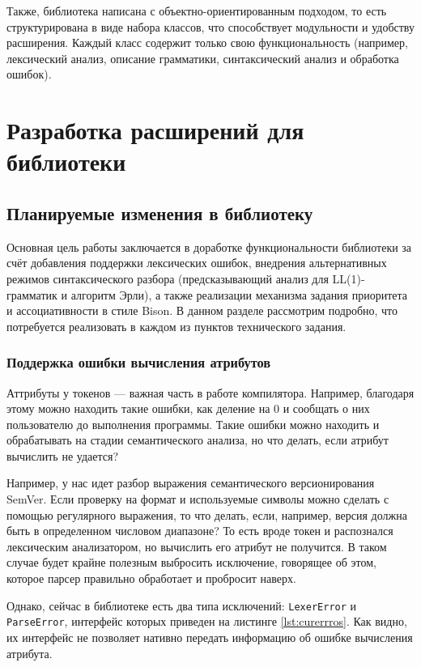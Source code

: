 \documentclass[14pt, russian]{scrartcl}
\begin{document}
Также, библиотека написана с объектно-ориентированным подходом, то есть структурирована в виде набора классов,
что способствует модульности и удобству расширения. Каждый класс содержит только свою функциональность
(например, лексический анализ, описание грамматики, синтаксический анализ и обработка ошибок).

\section{Разработка расширений для библиотеки}

\subsection{Планируемые изменения в библиотеку}

Основная цель работы заключается в доработке функциональности библиотеки за счёт добавления поддержки лексических
ошибок, внедрения альтернативных режимов синтаксического разбора (предсказывающий анализ для LL(1)-грамматик
и алгоритм Эрли), а также реализации механизма задания приоритета и ассоциативности в стиле Bison. В данном разделе
рассмотрим подробно, что потребуется реализовать в каждом из пунктов технического задания.

\subsubsection{Поддержка ошибки вычисления атрибутов}

Аттрибуты у токенов --- важная часть в работе компилятора. Например, благодаря этому можно находить такие ошибки, как
деление на 0 и сообщать о них пользователю до выполнения программы. Такие ошибки можно находить и обрабатывать
на стадии семантического анализа, но что делать, если атрибут вычислить не удается?

Например, у нас идет разбор
выражения семантического версионирования SemVer. Если проверку на формат и используемые символы можно сделать с помощью
регулярного выражения, то что делать, если, например, версия должна быть в определенном числовом диапазоне? То есть
вроде токен и распознался лексическим анализатором, но вычислить его атрибут не получится. В таком случае будет
крайне полезным выбросить исключение, говорящее об этом, которое парсер правильно обработает и пробросит наверх.

Однако, сейчас в библиотеке есть два типа исключений: \texttt{LexerError} и \texttt{ParseError}, интерфейс которых
приведен на листинге \ref{lst:curerrros}. Как видно, их интерфейс не позволяет нативно передать информацию об ошибке
вычисления атрибута.
\end{document}
